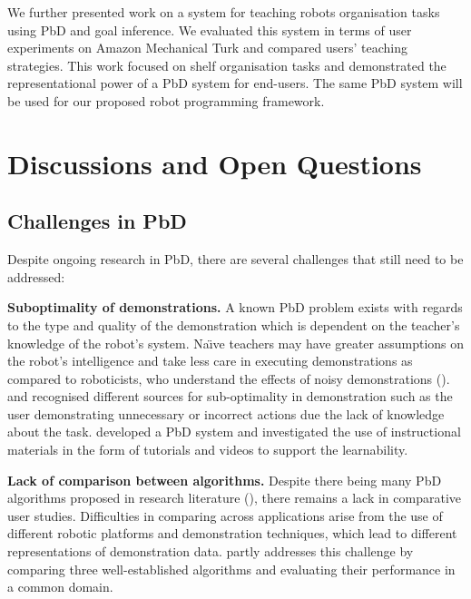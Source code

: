 We further presented work on a system for teaching robots organisation tasks using PbD and goal inference. 
We evaluated this system in terms of user experiments on Amazon Mechanical Turk and compared users' teaching strategies.
This work focused on shelf organisation tasks and demonstrated the representational power of a PbD system for end-users. 
The same PbD system will be used for our proposed robot programming framework.



\section{Discussions and Open Questions}
\label{sec:discussions}

\subsection{Challenges in PbD}\label{sssec:Challenges in PbD}
Despite ongoing research in PbD, there are several challenges that still need to be addressed:

\textbf{Suboptimality of demonstrations.}
A known PbD problem exists with regards to the type and quality of the demonstration which is dependent on the teacher's knowledge of the robot's system.
Na\"{\i}ve teachers may have greater assumptions on the robot's intelligence and take less care in executing demonstrations as compared to roboticists, who understand the effects of noisy demonstrations (\cite{suay2012practical}).
\cite{chen2003programing} and \cite{kaiser1995obtaining} recognised different sources for sub-optimality in demonstration such as the user demonstrating unnecessary or incorrect actions due the lack of knowledge about the task.
\cite{cakmak2014teaching} developed a PbD system and investigated the use of instructional materials in the form of tutorials and videos to support the learnability.

\textbf{Lack of comparison between algorithms.}
Despite there being many PbD algorithms proposed in research literature (\cite{argall2009survey,billing2010formalism}), there remains a lack in comparative user studies.
Difficulties in comparing across applications arise from the use of different robotic platforms and demonstration techniques, which lead to different representations of demonstration data.
\cite{suay2012practical} partly addresses this challenge by comparing three well-established algorithms and evaluating their performance in a common domain.


